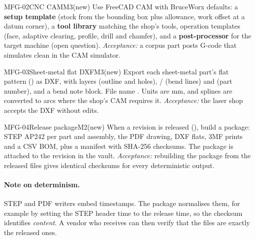\begin{epic}{MFG-02}{CNC CAM}{M3}{\stTodo}{(new)}
Use FreeCAD CAM with BruceWorx defaults: a \textbf{setup template} (stock from the bounding box plus
allowance, work offset at a datum corner), a \textbf{tool library} matching the shop's tools, operation
templates (face, adaptive clearing, profile, drill and chamfer), and a \textbf{post-processor} for the target
machine (open question).
\emph{Acceptance:} a corpus part posts G-code that simulates clean in the CAM simulator.
\end{epic}

\begin{epic}{MFG-03}{Sheet-metal flat DXF}{M3}{\stTodo}{(new)}
Export each sheet-metal part's flat pattern () as DXF, with layers  (outline and
holes), / (bend lines) and  (part number), and a bend note
block. File name . Units are mm, and splines are converted to arcs where the shop's CAM
requires it.
\emph{Acceptance:} the laser shop accepts the DXF without edits.
\end{epic}

\begin{epic}{MFG-04}{Release package}{M2}{\stTodo}{(new)}
When a revision is released (), build a package: STEP AP242 per part and assembly, the PDF
drawing, DXF flats, 3MF prints and a CSV BOM, plus a manifest with SHA-256 checksums. The package is attached
to the revision in the vault.
\emph{Acceptance:} rebuilding the package from the released files gives identical checksums for every
deterministic output.
\end{epic}

\paragraph{Note on determinism.} STEP and PDF writers embed timestamps. The package normalises them, for
example by setting the STEP header time to the release time, so the checksum identifies \emph{content}.
A vendor who receives  can then verify that the files are exactly the released ones.
